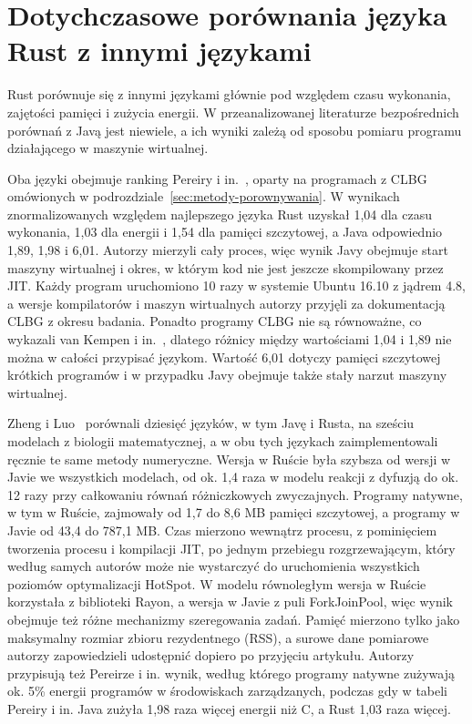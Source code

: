 \section{Dotychczasowe porównania języka Rust z innymi językami}
\label{sec:porownania-rust}

Rust porównuje się z innymi językami głównie pod względem czasu wykonania, zajętości pamięci i zużycia energii.
W przeanalizowanej literaturze bezpośrednich porównań z Javą jest niewiele, a ich wyniki zależą od sposobu pomiaru programu działającego w maszynie wirtualnej.

Oba języki obejmuje ranking Pereiry i in.~\cite{pereira2021}, oparty na programach z CLBG omówionych w podrozdziale~\ref{sec:metody-porownywania}.
W wynikach znormalizowanych względem najlepszego języka Rust uzyskał 1,04 dla czasu wykonania, 1,03 dla energii i 1,54 dla pamięci szczytowej, a Java odpowiednio 1,89, 1,98 i 6,01.
Autorzy mierzyli cały proces, więc wynik Javy obejmuje start maszyny wirtualnej i okres, w którym kod nie jest jeszcze skompilowany przez JIT.
Każdy program uruchomiono 10 razy w systemie Ubuntu 16.10 z jądrem 4.8, a wersje kompilatorów i maszyn wirtualnych autorzy przyjęli za dokumentacją CLBG z okresu badania.
Ponadto programy CLBG nie są równoważne, co wykazali van Kempen i in.~\cite{vankempen2025}, dlatego różnicy między wartościami 1,04 i 1,89 nie można w całości przypisać językom.
Wartość 6,01 dotyczy pamięci szczytowej krótkich programów i w przypadku Javy obejmuje także stały narzut maszyny wirtualnej.

Zheng i Luo~\cite{zheng2026} porównali dziesięć języków, w tym Javę i Rusta, na sześciu modelach z biologii matematycznej, a w obu tych językach zaimplementowali ręcznie te same metody numeryczne.
Wersja w Ruście była szybsza od wersji w Javie we wszystkich modelach, od ok. 1,4 raza w modelu reakcji z dyfuzją do ok. 12 razy przy całkowaniu równań różniczkowych zwyczajnych.
Programy natywne, w tym w Ruście, zajmowały od 1,7 do 8,6 MB pamięci szczytowej, a programy w Javie od 43,4 do 787,1 MB.
Czas mierzono wewnątrz procesu, z pominięciem tworzenia procesu i kompilacji JIT, po jednym przebiegu rozgrzewającym, który według samych autorów może nie wystarczyć do uruchomienia wszystkich poziomów optymalizacji HotSpot.
W modelu równoległym wersja w Ruście korzystała z biblioteki Rayon, a wersja w Javie z puli ForkJoinPool, więc wynik obejmuje też różne mechanizmy szeregowania zadań.
Pamięć mierzono tylko jako maksymalny rozmiar zbioru rezydentnego (RSS), a surowe dane pomiarowe autorzy zapowiedzieli udostępnić dopiero po przyjęciu artykułu.
Autorzy przypisują też Pereirze i in. wynik, według którego programy natywne zużywają ok. 5\% energii programów w środowiskach zarządzanych, podczas gdy w tabeli Pereiry i in. Java zużyła 1,98 raza więcej energii niż C, a Rust 1,03 raza więcej.

